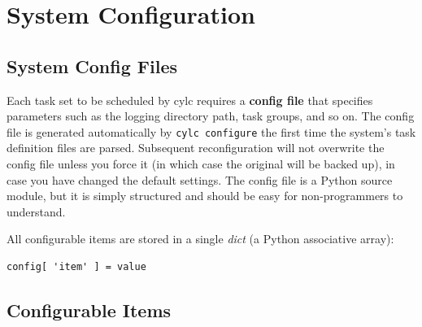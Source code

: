 \documentclass[11pt,a4paper]{article}
\begin{document}
\section{System Configuration}
\label{SystemConfiguration}

\subsection{System Config Files}
\label{SystemConfigFiles}

Each task set to be scheduled by cylc requires a {\bf config file} that
specifies parameters such as the logging directory path, task groups,
and so on. The config file is generated automatically by 
\lstinline=cylc configure= the first time the system's task definition
files are parsed. Subsequent reconfiguration will not overwrite the
config file unless you force it (in which case the original will be
backed up), in case you have changed the default settings. The config
file is a Python source module, but it is simply structured and should
be easy for non-programmers to understand. 

All configurable items are stored in a single {\em dict} (a Python
associative array):

\lstset{language=Python}
\begin{lstlisting}
config[ 'item' ] = value
\end{lstlisting}

\subsection{Configurable Items}
\label{ConfigurableItems}
\end{document}
